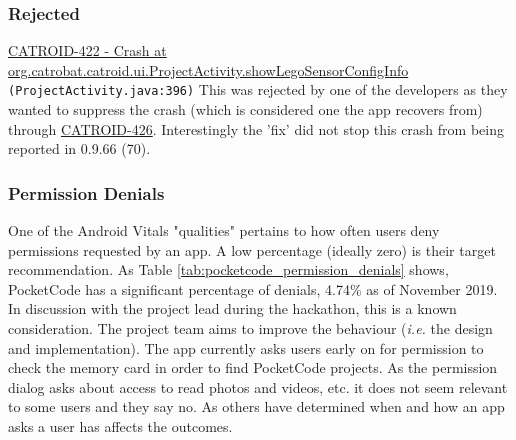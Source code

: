 \subsubsection{Rejected}
\href{https://jira.catrob.at/browse/CATROID-422}{CATROID-422 - Crash at org.catrobat.catroid.ui.ProjectActivity.showLegoSensorConfigInfo } \texttt{(ProjectActivity.java:396)} %
This was rejected by one of the developers as they wanted to suppress the crash (which is considered one the app recovers from) through \href{https://jira.catrob.at/browse/CATROID-426}{CATROID-426}. Interestingly the 'fix' did not stop this crash from being reported in 0.9.66 (70).

\subsubsection{Permission Denials}
One of the Android Vitals "qualities" pertains to how often users deny permissions requested by an app. A low percentage (ideally zero) is their target recommendation. As Table \ref{tab:pocketcode_permission_denials} shows, PocketCode has a significant percentage of denials, 4.74\% as of  November 2019. In discussion with the project lead %
during the hackathon, this is a known consideration. The project team aims to improve the behaviour (\emph{i.e.} the design and implementation). The app currently asks users early on for permission to check the memory card in order to find PocketCode projects. As the permission dialog asks about access to read photos and videos, etc. it does not seem relevant to some users and they say no. As others have determined  when and how an app asks a user has affects the outcomes.



